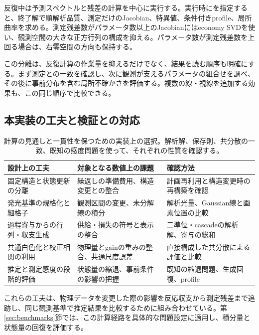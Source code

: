 反復中は予測スペクトルと残差の計算を中心に実行する。実行時にを指定すると、終了解で順解析品質、測定だけのJacobian、特異値、条件付きprofile、局所曲率を求める。測定残差数がパラメータ数以上のJacobianにはeconomy SVDを使い、観測空間の大きな正方行列の構成を抑える。パラメータ数が測定残差数を上回る場合は、右零空間の方向も保持する。

この分離は、反復計算の作業量を抑えるだけでなく、結果を読む順序も明確にする。まず測定との一致を確認し、次に観測が支えるパラメータの組合せを調べ、その後に事前分布を含む局所不確かさを評価する。複数の線・視線を追加する効果も、この同じ順序で比較できる。

\subsection{本実装の工夫と検証との対応}
\begin{table}[htbp]
\centering\small
\begin{tabularx}{\linewidth}{p{34mm}YY}
\toprule
設計上の工夫 & 対象となる数値上の課題 & 確認方法 \\
\midrule
固定構造と状態更新の分離 & 繰返しの準備費用、構造変更との整合 & 計画再利用と構造変更時の再構築を確認 \\
発光基準の規格化と細格子 & 観測区間の変更、未分解線の積分 & 解析光量、Gaussian線と画素位置の比較 \\
過程寄与からの行列・収支生成 & 供給・損失の符号と表示の整合 & 二準位・cascadeの解析解、寄与の総和 \\
共通白色化と校正相関の利用 & 物理量とgainの重みの整合、共通尺度誤差 & 直接構成した共分散による評価と比較 \\
推定と測定感度の段階的評価 & 状態量の縮退、事前条件の影響の把握 & 既知の縮退問題、生成回復、profile \\
\bottomrule
\end{tabularx}
\caption{計算の見通しと一貫性を保つための実装上の選択。解析解、保存則、共分散の一致、既知の感度問題を使って、それぞれの性質を確認する。}
\label{tab:numerical-design}
\end{table}

これらの工夫は、物理データを変更した際の影響を反応収支から測定残差まで追跡し、同じ観測基準で推定結果を比較するために組み合わせている。第\ref{sec:benchmarks}節では、この計算経路を具体的な問題設定に適用し、積分量と状態量の回復を評価する。
